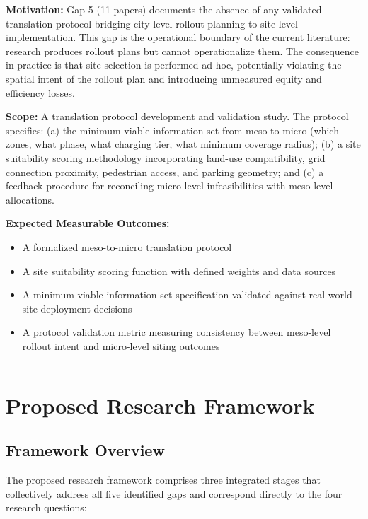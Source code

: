 \documentclass[letterpaper, 12pt, oneside, doublespacing]{Thesis}
\begin{document}
\noindent \textbf{Motivation:} Gap 5 (11 papers) documents the absence of any validated translation protocol bridging city-level rollout planning to site-level implementation. This gap is the operational boundary of the current literature: research produces rollout plans but cannot operationalize them. The consequence in practice is that site selection is performed ad hoc, potentially violating the spatial intent of the rollout plan and introducing unmeasured equity and efficiency losses.



\noindent \textbf{Scope:} A translation protocol development and validation study. The protocol specifies: (a) the minimum viable information set from meso to micro (which zones, what phase, what charging tier, what minimum coverage radius); (b) a site suitability scoring methodology incorporating land-use compatibility, grid connection proximity, pedestrian access, and parking geometry; and (c) a feedback procedure for reconciling micro-level infeasibilities with meso-level allocations.



\noindent \textbf{Expected Measurable Outcomes:}

\begin{itemize}
  \item A formalized meso-to-micro translation protocol
  \item A site suitability scoring function with defined weights and data sources
  \item A minimum viable information set specification validated against real-world site deployment decisions
  \item A protocol validation metric measuring consistency between meso-level rollout intent and micro-level siting outcomes
\end{itemize}



\bigskip\noindent\rule{\linewidth}{0.4pt}\bigskip


\chapter{Proposed Research Framework}

\section{Framework Overview}

The proposed research framework comprises three integrated stages that collectively address all five identified gaps and correspond directly to the four research questions:
\end{document}

